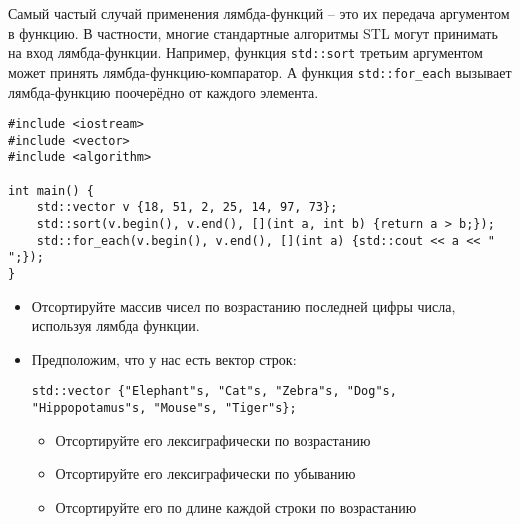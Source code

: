 \documentclass{article}
\begin{document}
Самый частый случай применения лямбда-функций -- это их передача аргументом в функцию. В частности, многие стандартные алгоритмы STL могут принимать на вход лямбда-функции. Например, функция \texttt{std::sort} третьим аргументом может принять лямбда-функцию-компаратор. А функция \texttt{std::for\_each} вызывает лямбда-функцию поочерёдно от каждого элемента.

\begin{lstlisting}
#include <iostream>
#include <vector>
#include <algorithm>

int main() {
    std::vector v {18, 51, 2, 25, 14, 97, 73};
    std::sort(v.begin(), v.end(), [](int a, int b) {return a > b;});
    std::for_each(v.begin(), v.end(), [](int a) {std::cout << a << " ";});
}
\end{lstlisting}

\begin{itemize}
\item Отсортируйте массив чисел по возрастанию последней цифры числа, используя лямбда функции.
\item Предположим, что у нас есть вектор строк:
\begin{lstlisting}
std::vector {"Elephant"s, "Cat"s, "Zebra"s, "Dog"s, "Hippopotamus"s, "Mouse"s, "Tiger"s};
\end{lstlisting}
\begin{itemize}
\item Отсортируйте его лексиграфически по возрастанию
\item Отсортируйте его лексиграфически по убыванию
\item Отсортируйте его по длине каждой строки по возрастанию
\end{itemize}
\end{itemize}
\end{document}

